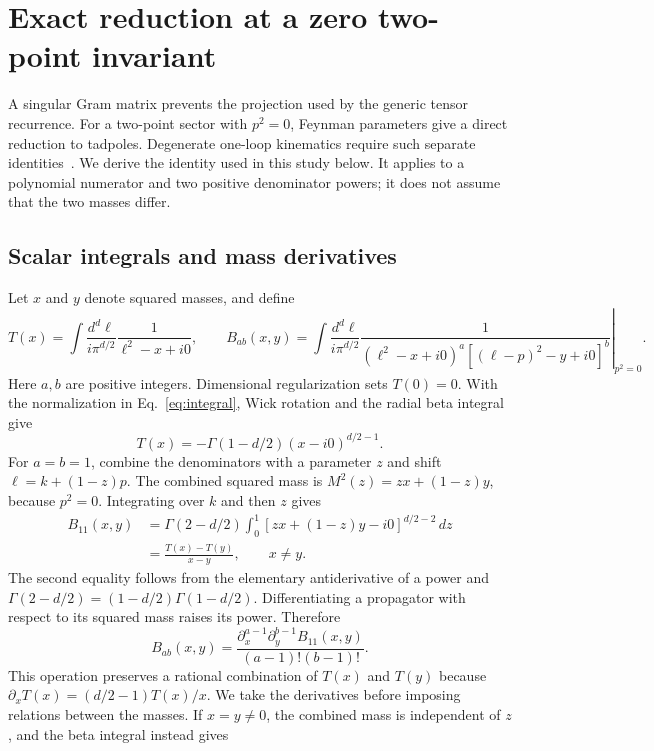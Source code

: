 \section{Exact reduction at a zero two-point invariant}
\label{app:lightlike}
A singular Gram matrix prevents the projection used by the generic tensor recurrence. For a two-point sector with $p^2=0$, Feynman parameters give a direct reduction to tadpoles. Degenerate one-loop kinematics require such separate identities~\cite{DennerDittmaier2006}. We derive the identity used in this study below. It applies to a polynomial numerator and two positive denominator powers; it does not assume that the two masses differ.

\subsection{Scalar integrals and mass derivatives}
Let $x$ and $y$ denote squared masses, and define
\begin{equation}
 T(x)=\int\frac{d^d\ell}{i\pi^{d/2}}\frac{1}{\ell^2-x+i0},\qquad
 B_{ab}(x,y)=\left.\int\frac{d^d\ell}{i\pi^{d/2}}
 \frac{1}{(\ell^2-x+i0)^a[(\ell-p)^2-y+i0]^b}\right|_{p^2=0}.
 \label{eq:light-def}
\end{equation}
Here $a,b$ are positive integers. Dimensional regularization sets $T(0)=0$. With the normalization in Eq.~\eqref{eq:integral}, Wick rotation and the radial beta integral give~\cite{Weinzierl2022}
\begin{equation}
 T(x)=-\Gamma(1-d/2)(x-i0)^{d/2-1}.
 \label{eq:light-tad}
\end{equation}
For $a=b=1$, combine the denominators with a parameter $z$ and shift $\ell=k+(1-z)p$. The combined squared mass is $M^2(z)=zx+(1-z)y$, because $p^2=0$. Integrating over $k$ and then $z$ gives
\begin{align}
 B_{11}(x,y)
 &=\Gamma(2-d/2)\int_0^1 [zx+(1-z)y-i0]^{d/2-2}\,dz\nonumber\\
 &=\frac{T(x)-T(y)}{x-y},\qquad x\ne y.
 \label{eq:light-difference}
\end{align}
The second equality follows from the elementary antiderivative of a power and $\Gamma(2-d/2)=(1-d/2)\Gamma(1-d/2)$. Differentiating a propagator with respect to its squared mass raises its power. Therefore
\begin{equation}
 B_{ab}(x,y)=\frac{\partial_x^{a-1}\partial_y^{b-1}B_{11}(x,y)}{(a-1)!(b-1)!}.
 \label{eq:light-derivative}
\end{equation}
This operation preserves a rational combination of $T(x)$ and $T(y)$ because $\partial_xT(x)=(d/2-1)T(x)/x$. We take the derivatives before imposing relations between the masses. If $x=y\ne0$, the combined mass is independent of $z$, and the beta integral instead gives
